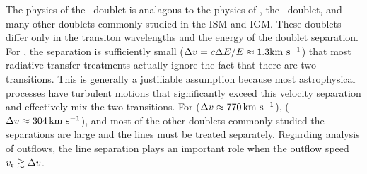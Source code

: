 \documentclass[12pt,preprint]{aastex}
\begin{document}
The physics of the \mgiid\ doublet
is analagous to the physics of 
\lya, the \naid\ doublet, and many other doublets commonly
studied in the ISM and IGM.  These doublets differ only in
the transiton wavelengths and the energy of the doublet separation. 
For  \lya, the
separation is sufficiently small ($\Delta v = c \Delta E / E \approx
1.3 {\rm km~s^{-1}}$) that most radiative transfer treatments actually ignore the fact that
there are two transitions.   This is generally a justifiable
assumption because 
most astrophysical processes have turbulent motions that
significantly exceed this velocity separation and effectively mix the
two transitions.  For  ($\Delta v \approx 770 \, {\rm km~s^{-1}}$),  
 ($\Delta v \approx 304 \, {\rm km~s^{-1}}$), and most of the other doublets
commonly studied the separations are large and the lines
must be treated separately.  Regarding analysis of outflows, the line
separation plays an important role when the outflow speed $v_{\rm r}
\gtrsim \Delta v$.
\end{document}
